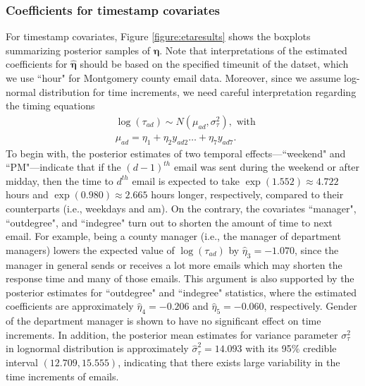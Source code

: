 \documentclass[ba]{imsart}
\numberwithin{equation}{section}
\theoremstyle{plain}
\begin{document}
\subsubsection{Coefficients for timestamp covariates}
	For timestamp covariates, Figure \ref{figure:etaresults} shows the boxplots summarizing posterior samples of $\boldsymbol{\eta}$. Note that interpretations of the estimated coefficients for $\hat{\boldsymbol{\eta}}$ should be based on the specified timeunit of the datset, which we use ``hour" for Montgomery county email data. Moreover, since we assume log-normal distribution for time increments, we need careful interpretation regarding the timing equations
	\begin{equation*}
	\begin{aligned}
	&\log(\tau_{ad}) \sim N(\mu_{ad}, \sigma_\tau^2), \mbox{ with }\\
	&\mu_{ad} = \eta_{1}+\eta_{2} y_{ad2}\ldots+\eta_{7}y_{ad7}.
	\end{aligned}
	\end{equation*}
	To begin with, the posterior estimates of two temporal effects---``weekend" and ``PM"---indicate that if the ${(d-1)}^{th}$ email was sent during the weekend or after midday, then the time to $d^{th}$ email is expected to take $\exp(1.552)\approx 4.722$ hours and $\exp(0.980)\approx2.665$ hours longer, respectively, compared to their counterparts (i.e., weekdays and am). On the contrary, the covariates ``manager", ``outdegree", and ``indegree" turn out to shorten the amount of time to next email. For example, being a county manager (i.e., the manager of department managers) lowers the expected value of $\log(\tau_{ad})$ by $\hat{\eta}_3 = -1.070$, since the manager in general sends or receives a lot more emails which may shorten the response time and many of those emails. This argument is also supported by the posterior estimates for ``outdegree" and ``indegree" statistics, where the estimated coefficients are approximately $\hat{\eta}_4=-0.206$ and $\hat{\eta}_5=-0.060$, respectively. Gender of the department manager is shown to have no significant effect on time increments. In addition, the posterior mean estimates for variance parameter $\sigma^2_\tau$ in lognormal distribution is approximately $\hat{\sigma}^2_\tau=14.093$ with its 95\% credible interval $(12.709, 15.555)$, indicating that there exists large variability in the time increments of emails.
\end{document}
